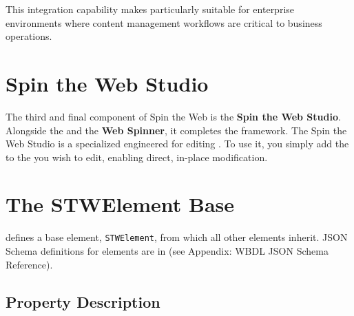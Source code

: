 This integration capability makes \wbdl{} particularly suitable for enterprise environments where content management workflows are critical to business operations.

\section{Spin the Web Studio}
\label{sec:studio}

The third and final component of Spin the Web is the \textbf{Spin the Web Studio}. Alongside the \textbf{\wbdl{}} and the \textbf{Web Spinner}, it completes the framework. The Spin the Web Studio is a specialized \webbaselet{} engineered for editing . To use it, you simply add the \webbaselet{} to the \webbase{} you wish to edit, enabling direct, in-place modification.

\section{The STWElement Base}
\label{sec:stwelement-base}

\wbdl{} defines a base element, \texttt{STWElement}, from which all other elements inherit. JSON Schema definitions for \wbdl{} elements are in  (see Appendix: WBDL JSON Schema Reference).

\subsection{Property Description}

